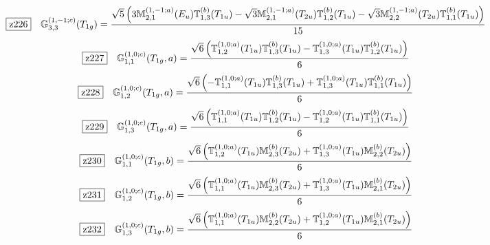 \documentclass[fleqn,10pt,landscape]{jsarticle}
\begin{document}
\begin{dmath*}
\hspace*{3mm}\fbox{z226}\quad \mathbb{G}_{3,3}^{(1,-1;c)}(T_{1g})=\frac{\sqrt{5} \left(3 \mathbb{M}_{2,1}^{(1,-1;a)}(E_{u}) \mathbb{T}_{1,3}^{(b)}(T_{1u}) - \sqrt{3} \mathbb{M}_{2,1}^{(1,-1;a)}(T_{2u}) \mathbb{T}_{1,2}^{(b)}(T_{1u}) - \sqrt{3} \mathbb{M}_{2,2}^{(1,-1;a)}(T_{2u}) \mathbb{T}_{1,1}^{(b)}(T_{1u})\right)}{15}
\end{dmath*}
\begin{dmath*}
\hspace*{3mm}\fbox{z227}\quad \mathbb{G}_{1,1}^{(1,0;c)}(T_{1g},a)=\frac{\sqrt{6} \left(\mathbb{T}_{1,2}^{(1,0;a)}(T_{1u}) \mathbb{T}_{1,3}^{(b)}(T_{1u}) - \mathbb{T}_{1,3}^{(1,0;a)}(T_{1u}) \mathbb{T}_{1,2}^{(b)}(T_{1u})\right)}{6}
\end{dmath*}
\begin{dmath*}
\hspace*{3mm}\fbox{z228}\quad \mathbb{G}_{1,2}^{(1,0;c)}(T_{1g},a)=\frac{\sqrt{6} \left(- \mathbb{T}_{1,1}^{(1,0;a)}(T_{1u}) \mathbb{T}_{1,3}^{(b)}(T_{1u}) + \mathbb{T}_{1,3}^{(1,0;a)}(T_{1u}) \mathbb{T}_{1,1}^{(b)}(T_{1u})\right)}{6}
\end{dmath*}
\begin{dmath*}
\hspace*{3mm}\fbox{z229}\quad \mathbb{G}_{1,3}^{(1,0;c)}(T_{1g},a)=\frac{\sqrt{6} \left(\mathbb{T}_{1,1}^{(1,0;a)}(T_{1u}) \mathbb{T}_{1,2}^{(b)}(T_{1u}) - \mathbb{T}_{1,2}^{(1,0;a)}(T_{1u}) \mathbb{T}_{1,1}^{(b)}(T_{1u})\right)}{6}
\end{dmath*}
\begin{dmath*}
\hspace*{3mm}\fbox{z230}\quad \mathbb{G}_{1,1}^{(1,0;c)}(T_{1g},b)=\frac{\sqrt{6} \left(\mathbb{T}_{1,2}^{(1,0;a)}(T_{1u}) \mathbb{M}_{2,3}^{(b)}(T_{2u}) + \mathbb{T}_{1,3}^{(1,0;a)}(T_{1u}) \mathbb{M}_{2,2}^{(b)}(T_{2u})\right)}{6}
\end{dmath*}
\begin{dmath*}
\hspace*{3mm}\fbox{z231}\quad \mathbb{G}_{1,2}^{(1,0;c)}(T_{1g},b)=\frac{\sqrt{6} \left(\mathbb{T}_{1,1}^{(1,0;a)}(T_{1u}) \mathbb{M}_{2,3}^{(b)}(T_{2u}) + \mathbb{T}_{1,3}^{(1,0;a)}(T_{1u}) \mathbb{M}_{2,1}^{(b)}(T_{2u})\right)}{6}
\end{dmath*}
\begin{dmath*}
\hspace*{3mm}\fbox{z232}\quad \mathbb{G}_{1,3}^{(1,0;c)}(T_{1g},b)=\frac{\sqrt{6} \left(\mathbb{T}_{1,1}^{(1,0;a)}(T_{1u}) \mathbb{M}_{2,2}^{(b)}(T_{2u}) + \mathbb{T}_{1,2}^{(1,0;a)}(T_{1u}) \mathbb{M}_{2,1}^{(b)}(T_{2u})\right)}{6}
\end{dmath*}
\end{document}
